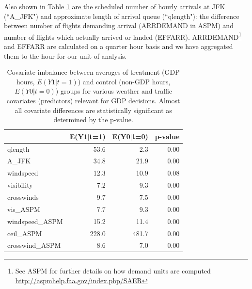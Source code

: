 \documentclass[conference]{IEEEtran}
\begin{document}
Also shown in Table \ref{tab:imbalance} are the scheduled number of hourly arrivals at JFK (``A\_JFK") and approximate length of arrival queue (``qlength"): the difference between number of flights demanding arrival (ARRDEMAND in ASPM) and number of flights which actually arrived or landed (EFFARR).  ARRDEMAND\footnote{See ASPM for further details on how demand units are computed \url{ http://aspmhelp.faa.gov/index.php/SAER}} and EFFARR are calculated on a quarter hour basis and we have aggregated them to the hour for our unit of analysis.  

\begin{table}[ht]
\centering
\begin{tabular}{lrrr}
  \hline
 & E(Y1$|$t=1) & E(Y0$|$t=0) & p-value \\ 
  \hline
qlength & 53.6 & 2.3 & 0.00 \\ 
  A\_JFK & 34.8 & 21.9 & 0.00 \\ 
  windspeed & 12.3 & 10.9 & 0.08 \\ 
  visibility & 7.2 & 9.3 & 0.00 \\ 
  crosswinds & 9.7 & 7.5 & 0.00 \\ 
  vis\_ASPM & 7.7 & 9.3 & 0.00 \\ 
  windspeed\_ASPM & 15.2 & 11.4 & 0.00 \\ 
  ceil\_ASPM & 228.0 & 481.7 & 0.00 \\ 
  crosswind\_ASPM & 8.6 & 7.0 & 0.00 \\ 
   \hline
\end{tabular}
\caption{Covariate imbalance between averages of treatment (GDP hours, $E(Y1|t=1)$)  and control (non-GDP hours, $E(Y0|t=0)$) groups for various weather and traffic covariates (predictors) relevant for GDP decisions.  Almost all covariate differences are statistically significant as determined by the p-value.} 
\label{tab:imbalance}
\end{table}
\end{document}
